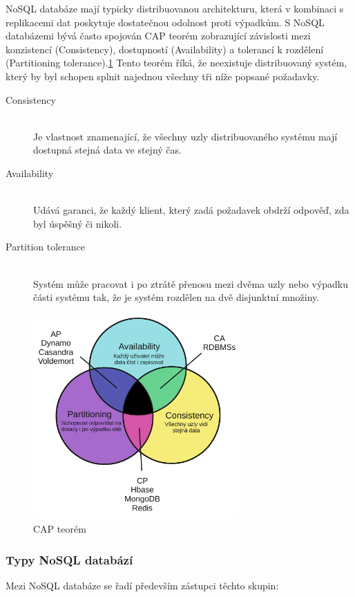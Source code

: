 \documentclass[thesis=M,czech]{FITthesis}[2012/06/26]
\begin{document}
NoSQL databáze mají typicky distribuovanou architekturu, která v kombinaci s replikacemi dat poskytuje dostatečnou odolnost proti výpadkům. S NoSQL databázemi bývá často spojován CAP teorém zobrazující závislosti mezi konzistencí (Consistency), dostupností (Availability)
a tolerancí k rozdělení (Partitioning tolerance).\ref{fig:cap} Tento teorém říká, že neexistuje distribuovaný systém, který by byl schopen splnit najednou všechny tři níže popsané požadavky.

\begin{description}
	\item[Consistency]\hfill \\
	 Je vlastnost znamenající, že všechny uzly distribuovaného systému mají dostupná stejná data ve stejný čas.
	\item[Availability] \hfill \\
	Udává garanci, že každý klient, který zadá požadavek obdrží odpověď, zda byl úspěšný či nikoli.
	\item[Partition tolerance]\hfill \\
	 Systém může pracovat i po ztrátě přenosu mezi dvěma uzly nebo výpadku části systému tak, že je systém rozdělen na dvě disjunktní množiny.
\end{description}

\begin{figure}[h]\centering 
	\includegraphics[width=0.7\textwidth, angle=0]			{files/cap}
	\caption[CAP teorém]{CAP teorém}\label{fig:cap}
\end{figure}
\pagebreak
\subsubsection{Typy NoSQL databází}
Mezi NoSQL databáze se řadí především zástupci těchto skupin:
\end{document}
